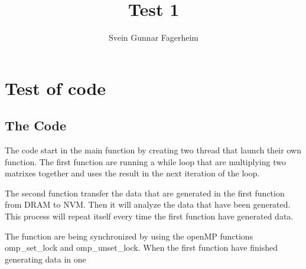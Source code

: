 \documentclass[11pt,a4paper]{article}      %
\title{Test 1}  %
\author{Svein Gunnar Fagerheim}      %
\begin{document}



\section{Test of code}
\subsection{The Code}
The code start in the main function by creating two thread that launch their own function. The first function are running a while loop that are multiplying two matrixes together and uses the result in the next iteration of the loop. 

The second function transfer the data that are generated in the first function
from DRAM to NVM. Then it will analyze the data that have been generated. This process will repeat itself every time the first function have generated data.

The function are being synchronized by using the openMP functions omp\_set\_lock and omp\_unset\_lock. When the first function have finished generating data in one 


\end{document}

